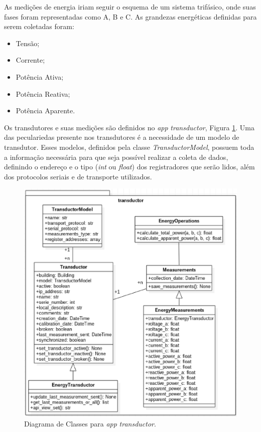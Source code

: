 As medições de energia iriam seguir o esquema de um sistema trifásico, onde suas fases foram representadas como A, B e C. As grandezas energéticas definidas para serem coletadas foram:

\begin{itemize}
    \item Tensão;
    \item Corrente;
    \item Potência Ativa;
    \item Potência Reativa;
    \item Potência Aparente.
\end{itemize}

Os transdutores e suas medições são definidos no \textit{app} \textit{transductor}, Figura \ref{transductor}. Uma das peculariedas presente nos transdutores é a necessidade de um modelo de transdutor. Esses modelos, definidos pela classe \textit{TransductorModel}, possuem toda a informação necessária para que seja possível realizar a coleta de dados, definindo o endereço e o tipo (\textit{int} ou \textit{float}) dos registradores que serão lidos, além dos protocolos seriais e de transporte utilizados.

\begin{figure}[!h]
    \centering
    \includegraphics[keepaspectratio=true,scale=0.7]{figuras/transductor.eps}
    \caption{Diagrama de Classes para \textit{app} \textit{transductor}.}
    \label{transductor}
\end{figure}

